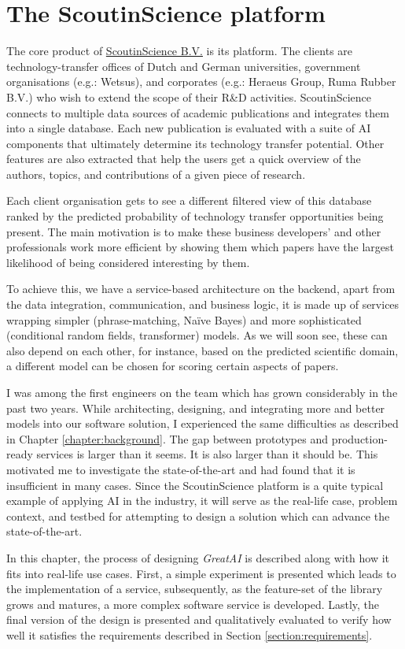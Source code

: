 \chapter{The ScoutinScience platform} \label{chapter:case}

The core product of \href{https://scoutinscience.com/}{ScoutinScience B.V.} is its platform. The clients are technology-transfer offices of Dutch and German universities, government organisations (e.g.: Wetsus), and corporates (e.g.: Heraeus Group, Ruma Rubber B.V.) who wish to extend the scope of their R\&D activities. ScoutinScience connects to multiple data sources of academic publications and integrates them into a single database. Each new publication is evaluated with a suite of AI components that ultimately determine its technology transfer potential. Other features are also extracted that help the users get a quick overview of the authors, topics, and contributions of a given piece of research.

Each client organisation gets to see a different filtered view of this database ranked by the predicted probability of technology transfer opportunities being present. The main motivation is to make these business developers' and other professionals work more efficient by showing them which papers have the largest likelihood of being considered interesting by them. 

To achieve this, we have a service-based architecture \cite{kleppmann2017designing} on the backend, apart from the data integration, communication, and business logic, it is made up of services wrapping simpler (phrase-matching, Naïve Bayes) and more sophisticated (conditional random fields, transformer) models. As we will soon see, these can also depend on each other, for instance, based on the predicted scientific domain, a different model can be chosen for scoring certain aspects of papers.

I was among the first engineers on the team which has grown considerably in the past two years. While architecting, designing, and integrating more and better models into our software solution, I experienced the same difficulties as described in Chapter \ref{chapter:background}. The gap between prototypes and production-ready services is larger than it seems. It is also larger than it should be. This motivated me to investigate the state-of-the-art and had found that it is insufficient in many cases. Since the ScoutinScience platform is a quite typical example of applying AI in the industry, it will serve as the real-life case, problem context, and testbed for attempting to design a solution which can advance the state-of-the-art.

In this chapter, the process of designing \textit{GreatAI} is described along with how it fits into real-life use cases. First, a simple experiment is presented which leads to the implementation of a service, subsequently, as the feature-set of the library grows and matures, a more complex software service is developed. Lastly, the final version of the design is presented and qualitatively evaluated to verify how well it satisfies the requirements described in Section \ref{section:requirements}.
